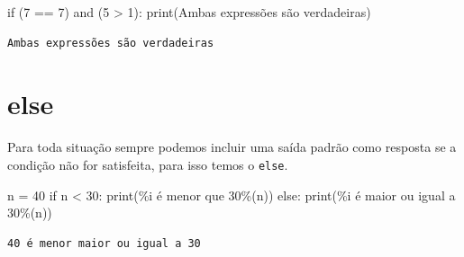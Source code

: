 \documentclass[
  letterpaper,
  DIV=11,
  numbers=noendperiod]{scrreprt}
\newenvironment{Shaded}{\begin{snugshade}}{\end{snugshade}}
\newcommand{\BuiltInTok}[1]{\textcolor[rgb]{0.00,0.23,0.31}{#1}}
\newcommand{\ControlFlowTok}[1]{\textcolor[rgb]{0.00,0.23,0.31}{#1}}
\newcommand{\DecValTok}[1]{\textcolor[rgb]{0.68,0.00,0.00}{#1}}
\newcommand{\KeywordTok}[1]{\textcolor[rgb]{0.00,0.23,0.31}{#1}}
\newcommand{\NormalTok}[1]{\textcolor[rgb]{0.00,0.23,0.31}{#1}}
\newcommand{\OperatorTok}[1]{\textcolor[rgb]{0.37,0.37,0.37}{#1}}
\newcommand{\SpecialCharTok}[1]{\textcolor[rgb]{0.37,0.37,0.37}{#1}}
\newcommand{\StringTok}[1]{\textcolor[rgb]{0.13,0.47,0.30}{#1}}
\begin{document}
\begin{Shaded}
\begin{Highlighting}[]
\ControlFlowTok{if}\NormalTok{ (}\DecValTok{7} \OperatorTok{==} \DecValTok{7}\NormalTok{) }\KeywordTok{and}\NormalTok{ (}\DecValTok{5} \OperatorTok{\textgreater{}} \DecValTok{1}\NormalTok{):}
    \BuiltInTok{print}\NormalTok{(}\StringTok{\textquotesingle{}Ambas expressões são verdadeiras\textquotesingle{}}\NormalTok{)}
\end{Highlighting}
\end{Shaded}

\begin{tcolorbox}[enhanced jigsaw, breakable, leftrule=.75mm, left=2mm, opacityback=0, bottomrule=.15mm, toprule=.15mm, rightrule=.15mm, arc=.35mm, colback=white]

\begin{verbatim}
Ambas expressões são verdadeiras
\end{verbatim}

\end{tcolorbox}

\hypertarget{else}{%
\section{else}\label{else}}

Para toda situação sempre podemos incluir uma saída padrão como resposta
se a condição não for satisfeita, para isso temos o \texttt{else}.

\begin{Shaded}
\begin{Highlighting}[]
\NormalTok{n }\OperatorTok{=} \DecValTok{40}
\ControlFlowTok{if}\NormalTok{ n }\OperatorTok{\textless{}} \DecValTok{30}\NormalTok{:}
    \BuiltInTok{print}\NormalTok{(}\StringTok{\textquotesingle{}}\SpecialCharTok{\%i}\StringTok{ é menor que 30\textquotesingle{}}\OperatorTok{\%}\NormalTok{(n))}
\ControlFlowTok{else}\NormalTok{:}
    \BuiltInTok{print}\NormalTok{(}\StringTok{\textquotesingle{}}\SpecialCharTok{\%i}\StringTok{ é maior ou igual a 30\textquotesingle{}}\OperatorTok{\%}\NormalTok{(n))}
\end{Highlighting}
\end{Shaded}

\begin{tcolorbox}[enhanced jigsaw, breakable, leftrule=.75mm, left=2mm, opacityback=0, bottomrule=.15mm, toprule=.15mm, rightrule=.15mm, arc=.35mm, colback=white]

\begin{verbatim}
40 é menor maior ou igual a 30
\end{verbatim}

\end{tcolorbox}
\end{document}
